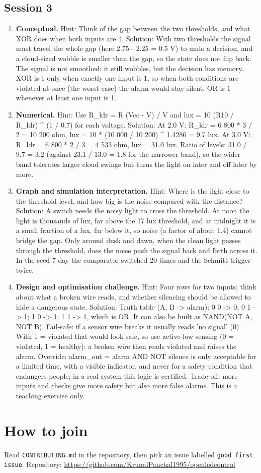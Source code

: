 \documentclass[11pt,a4paper]{article}
\begin{document}
\subsection*{Session 3}
\begin{enumerate}[nosep]
\item \textbf{Conceptual.} Hint: Think of the gap between the two thresholds, and what XOR does when both inputs are 1. Solution: With two thresholds the signal must travel the whole gap (here 2.75 - 2.25 = 0.5 V) to undo a decision, and a cloud-sized wobble is smaller than the gap, so the state does not flip back. The signal is not smoothed: it still wobbles, but the decision has memory. XOR is 1 only when exactly one input is 1, so when both conditions are violated at once (the worst case) the alarm would stay silent. OR is 1 whenever at least one input is 1.
\item \textbf{Numerical.} Hint: Use R\_ldr = R (Vcc - V) / V and lux = 10 (R10 / R\_ldr) \textasciicircum{} (1 / 0.7) for each voltage. Solution: At 2.0 V: R\_ldr = 6 800 * 3 / 2 = 10 200 ohm, lux = 10 * (10 000 / 10 200) \textasciicircum{} 1.4286 = 9.7 lux. At 3.0 V: R\_ldr = 6 800 * 2 / 3 = 4 533 ohm, lux = 31.0 lux. Ratio of levels: 31.0 / 9.7 = 3.2 (against 23.1 / 13.0 = 1.8 for the narrower band), so the wider band tolerates larger cloud swings but turns the light on later and off later by more.
\item \textbf{Graph and simulation interpretation.} Hint: Where is the light close to the threshold level, and how big is the noise compared with the distance? Solution: A switch needs the noisy light to cross the threshold. At noon the light is thousands of lux, far above the 17 lux threshold, and at midnight it is a small fraction of a lux, far below it, so noise (a factor of about 1.4) cannot bridge the gap. Only around dusk and dawn, when the clean light passes through the threshold, does the noise push the signal back and forth across it. In the seed 7 day the comparator switched 20 times and the Schmitt trigger twice.
\item \textbf{Design and optimisation challenge.} Hint: Four rows for two inputs; think about what a broken wire reads, and whether silencing should be allowed to hide a dangerous state. Solution: Truth table (A, B -\textgreater{} alarm): 0 0 -\textgreater{} 0; 0 1 -\textgreater{} 1; 1 0 -\textgreater{} 1; 1 1 -\textgreater{} 1, which is OR. It can also be built as NAND(NOT A, NOT B). Fail-safe: if a sensor wire breaks it usually reads 'no signal' (0). With 1 = violated that would look safe, so use active-low sensing (0 = violated, 1 = healthy): a broken wire then reads violated and raises the alarm. Override: alarm\_out = alarm AND NOT silence is only acceptable for a limited time, with a visible indicator, and never for a safety condition that endangers people; in a real system this logic is certified. Trade-off: more inputs and checks give more safety but also more false alarms. This is a teaching exercise only.
\end{enumerate}

\section{How to join}
Read \texttt{CONTRIBUTING.md} in the repository, then pick an issue labelled \texttt{good first issue}. Repository: \url{https://github.com/KrunalPanchal1995/openledcontrol}
\end{document}
